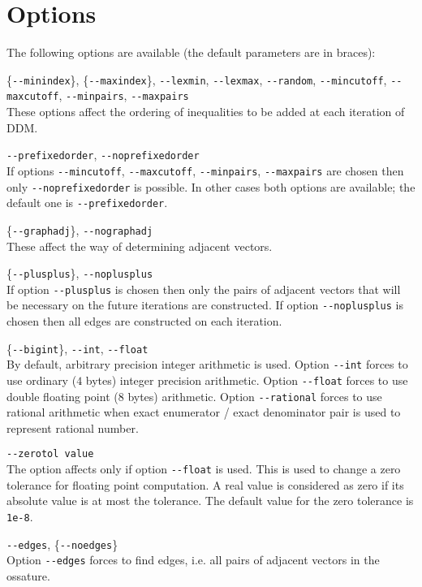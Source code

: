 \documentclass{article}
\newcommand{\params}{\smallskip\hangindent=2\parindent}
\begin{document}
\section{Options}

The following options are available (the default parameters are in braces):

\params
\{\verb$--minindex$\}, \{\verb$--maxindex$\}, \verb$--lexmin$, \verb$--lexmax$, \verb$--random$, \verb$--mincutoff$, 
\verb$--maxcutoff$, \verb$--minpairs$, \verb$--maxpairs$ \\
   These options
   affect the ordering of inequalities to be added at each iteration of DDM.

\params
\verb$--prefixedorder$, \verb$--noprefixedorder$ \\
  If options \verb$--mincutoff$, \verb$--maxcutoff$, \verb$--minpairs$, \verb$--maxpairs$ are chosen then
  only \verb$--noprefixedorder$ is possible. 
  In other cases both options are available; the default one is \verb$--prefixedorder$.

\params \{\verb$--graphadj$\}, \verb$--nographadj$ \\
  These affect the way of determining adjacent vectors.

\params \{\verb$--plusplus$\}, \verb$--noplusplus$ \\
  If option \verb$--plusplus$ is chosen then only the pairs of adjacent vectors 
  that will be necessary on the future iterations are constructed. If option \verb$--noplusplus$ is chosen 
  then all edges are constructed on each iteration.

\params \{\verb$--bigint$\}, \verb$--int$, \verb$--float$ \\
  By default, arbitrary precision integer arithmetic is used.
  Option \verb$--int$ forces to use ordinary ($4$ bytes) integer precision arithmetic.
  Option \verb$--float$ forces to use double floating point ($8$ bytes) arithmetic.
  Option \verb$--rational$ forces to use rational arithmetic when exact enumerator / exact denominator pair 
         is used to represent rational number.

\params \verb$--zerotol value$ \\
  The option affects only if option \verb$--float$ is used.
  This is used to change a zero tolerance for floating point computation.
  A real value is considered as zero if its absolute value is at most the tolerance. 
  The default value for the zero tolerance is \verb$1e-8$.

\params \verb$--edges$,  \{\verb$--noedges$\} \\
  Option \verb$--edges$ forces to find edges, i.e. all pairs of adjacent vectors 
  in the ossature.
\end{document}
